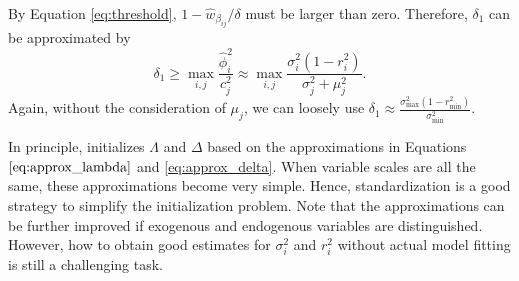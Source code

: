 \documentclass[nojss]{jss}
\begin{document}
\begin{appendix}
By Equation \ref{eq:threshold}, $1 - \hat{w}_{\beta_{ij}}/\delta$ must be larger than zero. Therefore, $\delta_1$ can be approximated by
\begin{equation} \label{eq:approx_delta}
\delta_1 \geq \max_{i,j} \frac{ \hat{\phi}_{i}^2 }{c_{j}^2} \approx \max_{i,j} \frac{  \sigma_i^2(1-r_{i}^2)}{ \sigma_j^2 +\mu_j^2 }.
\end{equation}
Again, without the consideration of $\mu_j$, we can loosely use $\delta_1 \approx \frac{  \sigma_\text{max}^2(1-r_\text{min}^2)}{\sigma_\text{min}^2 }$.

In principle,  initializes $\Lambda$ and $\Delta$ based on the approximations in Equations $\ref{eq:approx_lambda}$ and \ref{eq:approx_delta}. When variable scales are all the same, these approximations become very simple. Hence, standardization is a good strategy to simplify the initialization problem. Note that the approximations can be further improved if exogenous and endogenous variables are distinguished. However, how to obtain good estimates for $\sigma_{i}^2$ and $r_i^2$ without actual model fitting is still a challenging task. 

\end{appendix}
\end{document}
